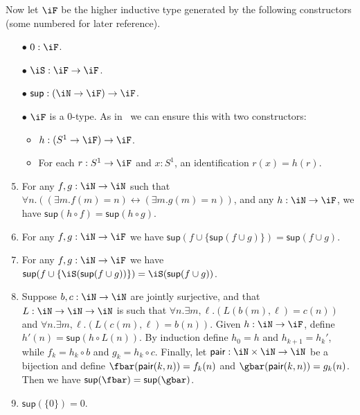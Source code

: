 \documentclass{amsart}
\let\N\iN
\let\sec\S
\let\S\cS
\def\sup{\mathsf{sup}}
\begin{document}
Now let $\iF$ be the higher inductive type generated by the following constructors (some numbered for later reference).
\begin{enumerate}[label=(\arabic*)]%
\item[$\bullet$] $0:\iF$.
\item[$\bullet$] $\iS:\iF\to\iF$.
\item[$\bullet$] $\sup : (\N\to\iF)\to\iF$.
\item[$\bullet$] $\iF$ is a 0-type.
  As in~\cite[\sec7.3]{hottbook} we can ensure this with two constructors:
  \begin{itemize}
  \item $h: (S^1\to \iF) \to \iF$.
  \item For each $r:S^1\to\iF$ and $x:S^1$, an identification $r(x) = h(r)$.
  \end{itemize}
\item For any $f,g:\N\to\N$ such that $\forall n. ((\exists m. f(m)=n) \leftrightarrow (\exists m. g(m)=n))$, and any $h:\N\to \iF$, we have $\sup(h\circ f) = \sup(h\circ g)$.\label{item:f1}
\item For any $f,g:\N\to\iF$ we have $\sup(f \cup \{\sup(f\cup g)\}) = \sup(f\cup g)$.\label{item:f2}
\item For any $f,g:\N\to\iF$ we have $\sup(f \cup \{\iS(\sup(f\cup g))\}) = \iS(\sup(f\cup g))$.\label{item:f3}
\item Suppose $b,c:\N\to\N$ are jointly surjective, and that $L:\N\to\N\to\N$ is such that $\forall n. \exists m,\ell. (L(b(m),\ell)=c(n))$ and $\forall n. \exists m,\ell. (L(c(m),\ell)=b(n))$.
  Given $h:\N\to\iF$, define $h'(n) = \sup(h\circ L(n))$.
  By induction define $h_0 = h$ and $h_{k+1} = h_k'$, while $f_k = h_k \circ b$ and $g_k = h_k \circ c$.
  Finally, let $\mathsf{pair}:\N\times\N\to \N$ be a bijection and define $\fbar(\mathsf{pair}(k,n)) = f_k(n)$ and $\gbar(\mathsf{pair}(k,n)) = g_k(n)$.
  Then we have $\sup(\fbar) = \sup(\gbar)$.\label{item:f4}
\item $\sup(\{0\}) = 0$.\label{item:f5}
\end{enumerate}
\end{document}
